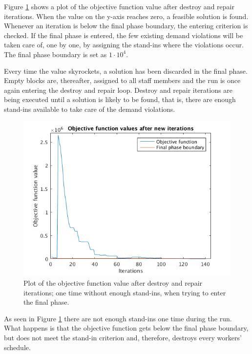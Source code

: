 Figure \ref{fig:feasibleRerun} shows a plot of the objective function value after destroy and repair iterations. When the value on the y-axis reaches zero, a feasible solution is found. Whenever an iteration is below the final phase boundary, the entering criterion is checked. If the final phase is entered, the few existing demand violations will be taken care of, one by one, by assigning the stand-ins where the violations occur. The final phase boundary is set as $1\cdot10^4$.

Every time the value skyrockets, a solution has been discarded in the final phase. Empty blocks are, thereafter, assigned to all staff members and the run is once again entering the destroy and repair loop. Destroy and repair iterations are being executed until a solution is likely to be found, that is, there are enough stand-ins available to take care of the demand violations. 

\begin{figure}[!h]
\centering
\includegraphics[scale = 0.8]{Chapters/ImagesClaes/1phase1iter1ReRun.png}
\caption{Plot of the objective function value after destroy and repair iterations; one time without enough stand-ins, when trying to enter the final phase.}
\label{fig:feasibleRerun}
\end{figure}

As seen in Figure \ref{fig:feasibleRerun} there are not enough stand-ins one time during the run. What happens is that the objective function gets below the final phase boundary, but does not meet the stand-in criterion and, therefore, destroys every workers' schedule. 

